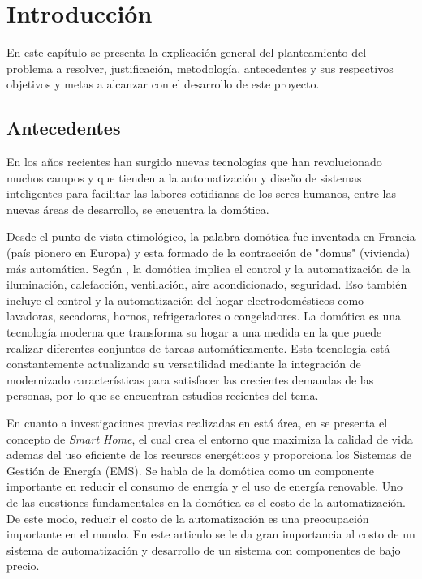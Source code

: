   \chapter{Introducción}
\label{C:introduccion}

En este capítulo se presenta la explicación general del planteamiento del problema a resolver, justificación, metodología, antecedentes y sus respectivos objetivos y metas a alcanzar con el desarrollo de este proyecto.

\section{Antecedentes}

En los años recientes han surgido nuevas tecnologías que han revolucionado muchos campos y que tienden a la automatización y diseño de sistemas inteligentes para facilitar las labores cotidianas de los seres humanos, entre las nuevas áreas de desarrollo, se encuentra la domótica.

Desde el punto de vista etimológico, la palabra domótica fue inventada en Francia (país pionero en Europa) y esta formado de la contracción de "domus" (vivienda) más automática. Según \cite{Vatti2017}, la domótica implica el control y la automatización de la iluminación, calefacción, ventilación, aire acondicionado, seguridad. Eso también incluye el control y la automatización del hogar electrodomésticos como lavadoras, secadoras, hornos, refrigeradores o congeladores. La domótica es una tecnología moderna que transforma su hogar a una medida en la que puede realizar diferentes conjuntos de tareas automáticamente. Esta tecnología está constantemente actualizando su versatilidad mediante la integración de modernizado características para satisfacer las crecientes demandas de las personas, por lo que se encuentran estudios recientes del tema.

En cuanto a investigaciones previas realizadas en está área, en \cite{Hassanpour2017} se presenta el concepto de \textit{Smart Home}, el cual crea el entorno que maximiza la calidad de vida ademas del uso eficiente de los recursos energéticos y proporciona los Sistemas de Gestión de Energía (EMS). Se habla de la domótica como un componente importante en reducir el consumo de energía y el uso de energía renovable. Uno de las cuestiones fundamentales en la domótica es el costo de la automatización. De este modo, reducir el costo de la automatización es una preocupación importante en el mundo. En este articulo se le da gran importancia al costo de un sistema de automatización y desarrollo de un sistema con componentes de bajo precio.

